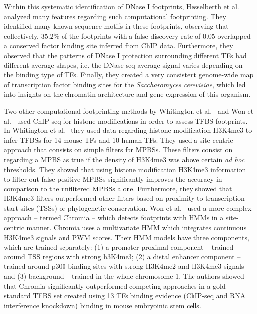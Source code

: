 Within this systematic identification of DNase I footprints, Hesselberth et al.~\cite{hesselberth2009} analyzed many features regarding such computational footprinting. They identified many known sequence motifs in these footprints, observing that collectively, $35.2\%$ of the footprints with a false discovery rate of $0.05$ overlapped a conserved factor binding site inferred from ChIP data. Furthermore, they observed that the patterns of DNase I protection surrounding different TFs had different average shapes, i.e. the DNase-seq average signal varies depending on the binding type of TFs. Finally, they created a very consistent genome-wide map of transcription factor binding sites for the \emph{Saccharomyces cerevisiae}, which led into insights on the chromatin architecture and gene expression of this organism.

Two other computational footprinting methods by Whitington et al.~\cite{whitington2009} and Won et al.~\cite{won2010} used ChIP-seq for histone modifications in order to assess TFBS footprints. In Whitington et al.~\cite{whitington2009} they used data regarding histone modification H3K4me3 to infer TFBSs for 14 mouse TFs and 10 human TFs. They used a site-centric approach that consists on simple filters for MPBSs. These filters consist on regarding a MPBS as true if the density of H3K4me3 was above certain \emph{ad hoc} thresholds. They showed that using histone modification H3K4me3 information to filter out false positive MPBSs significantly improves the accuracy in comparison to the unfiltered MPBSs alone. Furthermore, they showed that H3K4me3 filters outperformed other filters based on proximity to transcription start sites (TSSs) or phylogenetic conservation. Won et al.~\cite{won2010} used a more complex approach -- termed Chromia -- which detects footprints with HMMs in a site-centric manner. Chromia uses a multivariate HMM which integrates continuous H3K4me3 signals and PWM scores. Their HMM models have three components, which are trained separately: (1) a promoter-proximal component -- trained around TSS regions with strong h3K4me3; (2) a distal enhancer component -- trained around p300 binding sites with strong H3K4me2 and H3K4me3 signals and (3) background -- trained in the whole chromosome 1. The authors showed that Chromia significantly outperformed competing approaches in a gold standard TFBS set created using 13 TFs binding evidence (ChIP-seq and RNA interference knockdown) binding in mouse embryoinic stem cells.

